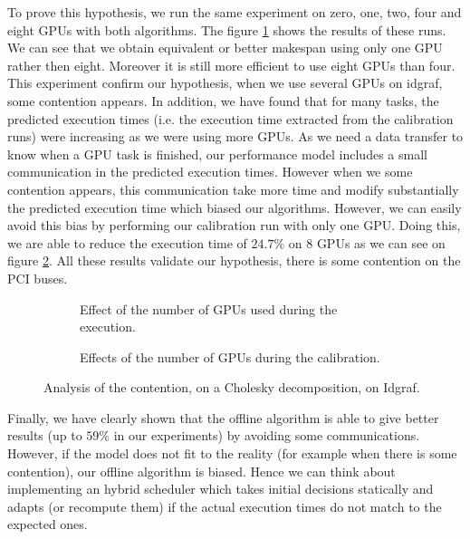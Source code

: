 \documentclass[10pt, conference, compsocconf,pdftex,dvipsnames]{IEEEtran}
\newcommand{\mytodo}[1]{\todo[inline]{#1}}
\begin{document}
\mytodo{Merci de relire ici, jusqu'au IV-A (inclus)}
To prove this hypothesis, we run the same experiment on zero, one, two, four
and eight GPUs with both algorithms. The figure \ref{fig:ContentionGpu} shows
the results of these runs.  We can see that we obtain equivalent or better
makespan using only one GPU rather then eight.  Moreover it is still more
efficient to use eight GPUs than four. This experiment confirm our hypothesis,
when we use several GPUs on idgraf, some contention appears. In addition, we
have found that for many tasks, the predicted execution times (i.e. the
execution time extracted from the calibration runs) were increasing as we were
using more GPUs. As we need a data transfer to know when a GPU task is
finished, our performance model includes a small communication in the
predicted execution times. However when we some contention appears, this
communication take more time and modify substantially the predicted execution
time which biased our algorithms.  However, we can easily avoid this bias by
performing our calibration run with only one GPU.  Doing this, we are able to
reduce the execution time of $24.7\%$ on 8 GPUs as we can see on figure
\ref{fig:ContentionTrick}. All these results validate our hypothesis, there is
some contention on the PCI buses.

\begin{figure}[htb]
    \centering
    \begin{subfigure}{0.5\textwidth}
        \scalebox{0.65}{
            
        }
        \caption{Effect of the number of GPUs used during the execution.}
        \label{fig:ContentionGpu}
    \end{subfigure}
    \begin{subfigure}{0.5\textwidth}
        \scalebox{0.65}{
            
        }
        \caption{Effects of the number of GPUs during the calibration.}
        \label{fig:ContentionTrick}
    \end{subfigure}
    \caption{Analysis of the contention, on a 
    Cholesky decomposition, on Idgraf.}
    \label{fig:Contention}
\end{figure}

Finally, we have clearly shown that the offline algorithm is able to give
better results (up to $59\%$ in our experiments) by avoiding some
communications. However, if the model does not fit to the reality (for example
when there is some contention), our offline algorithm is biased. Hence
we can think about implementing an hybrid scheduler which takes initial
decisions statically and adapts (or recompute them) if the actual execution
times do not match to the expected ones.
\end{document}

